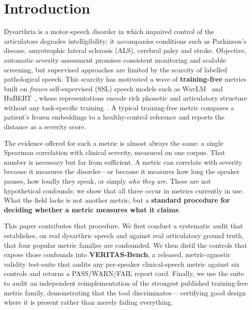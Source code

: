 \documentclass[runningheads]{llncs}
\begin{document}

\section{Introduction}
Dysarthria is a motor-speech disorder in which impaired control of the
articulators degrades intelligibility; it accompanies conditions such as
Parkinson's disease, amyotrophic lateral sclerosis (ALS), cerebral palsy and
stroke. Objective, automatic severity assessment promises consistent monitoring
and scalable screening, but supervised approaches are limited by the scarcity of
labelled pathological speech. This scarcity has motivated a wave of
\textbf{training-free} metrics built on \emph{frozen} self-supervised (SSL)
speech models such as WavLM~\cite{chen2022wavlm} and
HuBERT~\cite{hsu2021hubert}, whose representations encode rich phonetic and
articulatory structure without any task-specific training~\cite{mohamed2022review}.
A typical training-free metric compares a patient's frozen embeddings to a
healthy-control reference and reports the distance as a severity score.

The evidence offered for such a metric is almost always the same: a single
Spearman correlation with clinical severity, measured on one corpus. That number
is necessary but far from sufficient. A metric can correlate with severity
because it measures the disorder---or because it measures how long the speaker
pauses, how loudly they speak, or simply \emph{who they are}. These are not
hypothetical confounds; we show that all three occur in metrics currently in
use. What the field lacks is not another metric, but a \textbf{standard procedure
for deciding whether a metric measures what it claims}.

This paper contributes that procedure. We first conduct a systematic audit that
establishes, on real dysarthric speech and against real articulatory ground
truth, that four popular metric families are confounded. We then distil the
controls that expose those confounds into \textbf{VERITAS-Bench}, a released,
metric-agnostic validity test-suite that audits any per-speaker clinical-speech
metric against six controls and returns a PASS/WARN/FAIL report card. Finally, we
use the suite to audit an independent reimplementation of the strongest published
training-free metric family, demonstrating that the tool discriminates---
certifying good design where it is present rather than merely failing everything.
\end{document}
